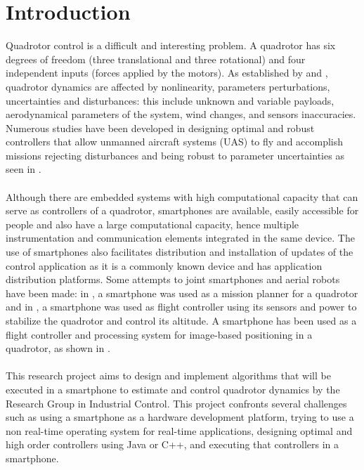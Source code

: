 \chapter{Introduction} \label{ch:introduction}
Quadrotor control is a difficult and interesting problem. A quadrotor has six degrees of freedom (three translational and three rotational) and four independent inputs (forces applied by the motors). As established by \cite{Liu2015} and \cite{Lopez2015}, quadrotor dynamics are affected by nonlinearity, parameters perturbations, uncertainties and disturbances: this include unknown and variable payloads, aerodynamical parameters of the system, wind changes, and sensors inaccuracies. Numerous studies have been developed in designing optimal and robust controllers that allow unmanned aircraft systems (UAS) to fly and accomplish missions rejecting disturbances and being robust to parameter uncertainties as seen in \cite{Jung2014, Kohno2014, Shang2016, Salazar2014}.\\\\
Although there are embedded systems with high computational capacity that can serve as controllers of a quadrotor, smartphones are available, easily accessible for people and also have a large computational capacity, hence multiple instrumentation and communication elements integrated in the same device. The use of smartphones also facilitates distribution and installation of updates of the control application as it is a commonly known device and has application distribution platforms. Some attempts to joint smartphones and aerial robots have been made: in \cite{Pearce2014a}, a smartphone was used as a mission planner for a quadrotor and in \cite{ALEMARK2014a}, a smartphone was used as flight controller using its sensors and power to stabilize the quadrotor and control its altitude. A smartphone has been used as a flight controller and processing system for image-based positioning in a quadrotor, as shown in \cite{Loianno2015}.
\\\\
This research project aims to design and implement algorithms that will be executed in a smartphone to estimate and control quadrotor dynamics by the Research Group in Industrial Control. This project confronts several challenges such as using a smartphone as a hardware development platform, trying to use a non real-time operating system for real-time applications, designing optimal and high order controllers using Java or C++, and executing that controllers in a smartphone.
\\\\
